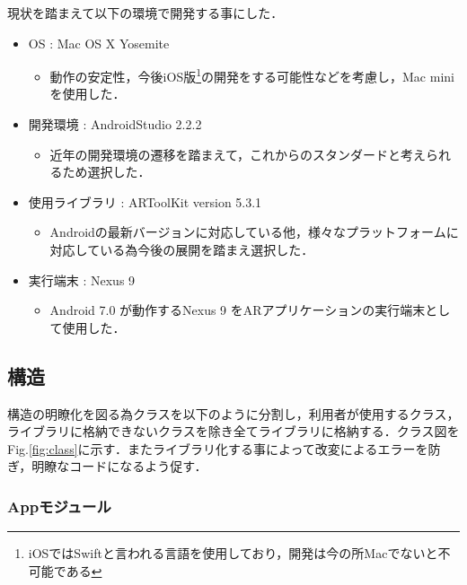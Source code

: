 \newpage
現状を踏まえて以下の環境で開発する事にした．
\begin{itemize}
 \item OS : Mac OS X Yosemite\cite{Yosemite}
       \begin{itemize}
	\item 動作の安定性，今後iOS版\footnote{iOSではSwiftと言われる言語を使用しており，開発は今の所Macでないと不可能である}の開発をする可能性などを考慮し，Mac miniを使用した．
       \end{itemize}
 \item 開発環境 : AndroidStudio 2.2.2
       \begin{itemize}
	\item 近年の開発環境の遷移を踏まえて，これからのスタンダードと考えられるため選択した．
       \end{itemize}
 \item 使用ライブラリ : ARToolKit version 5.3.1
       \begin{itemize}
	\item Androidの最新バージョンに対応している他，様々なプラットフォームに対応している為今後の展開を踏まえ選択した．
       \end{itemize}
 \item 実行端末 : Nexus 9\cite{Nexus9}
       \begin{itemize}
	\item Android 7.0 が動作するNexus 9 をARアプリケーションの実行端末として使用した．
       \end{itemize}
\end{itemize}

\subsection{構造}
構造の明瞭化を図る為クラスを以下のように分割し，利用者が使用するクラス，ライブラリに格納できないクラスを除き全てライブラリに格納する．クラス図をFig.\ref{fig:class}に示す．またライブラリ化する事によって改変によるエラーを防ぎ，明瞭なコードになるよう促す．

\subsubsection{Appモジュール}

